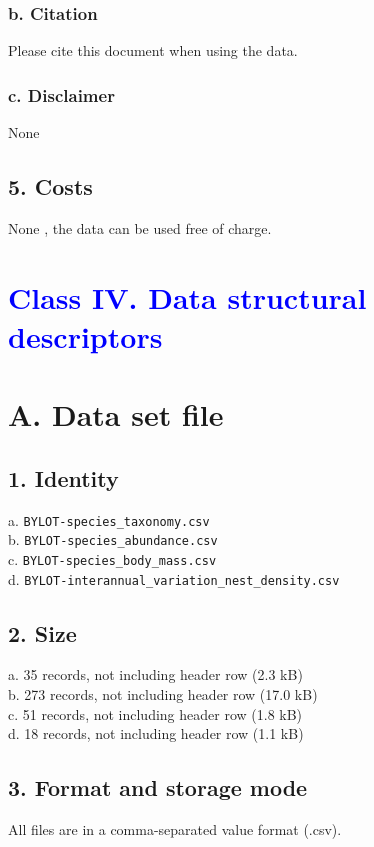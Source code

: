 \documentclass[a4paper,twoside,12pt]{article}
\begin{document}
        		\subsubsection*{b. Citation}
        		 Please cite this document when using the data.
        		\subsubsection*{c. Disclaimer} None
            		
        	\subsection*{5. Costs}
        	None	, the data can be used free of charge.		
\newpage
    
 \section*{\textcolor{Blue}{Class IV. Data structural descriptors}}
    \section*{A. Data set file}
    			\subsection*{1. Identity} 
    			a. \texttt{BYLOT-species\_taxonomy.csv}\\
     		b. \texttt{BYLOT-species\_abundance.csv}\\
     		c. \texttt{BYLOT-species\_body\_mass.csv}\\
    			d. \texttt{BYLOT-interannual\_variation\_nest\_density.csv}\\ 
    			
        		\subsection*{2. Size} 
        		a. 35 records, not including header row (2.3 kB)\\
        		b. 273 records, not including header row  (17.0 kB)\\
        		c. 51 records, not including header row  (1.8 kB)\\
        		d. 18 records, not including header row  (1.1 kB)
        		
        		\subsection*{3. Format and storage mode} All files are in a comma-separated value format (.csv). 
      
\end{document}
